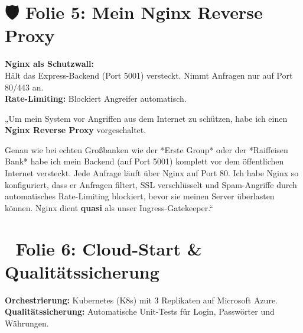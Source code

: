 \documentclass[11pt,a4paper]{article}
\begin{document}
\newpage

\section{🛡️ Folie 5: Mein Nginx Reverse Proxy}

\begin{tcolorbox}[colback=bglight, colframe=slidepurple, title=\textbf{\color{white}Visualisierung auf Folie 5}, arc=4pt]
\textbf{Nginx als Schutzwall:} \\
Hält das Express-Backend (Port 5001) versteckt. Nimmt Anfragen nur auf Port 80/443 an. \\
\textbf{Rate-Limiting:} Blockiert Angreifer automatisch.
\end{tcolorbox}

\begin{tcolorbox}[colback=white, colframe=primarynavy, title=\textbf{Mein Sprechtext (Ich-Form)}]
„Um mein System vor Angriffen aus dem Internet zu schützen, habe ich einen \textbf{Nginx Reverse Proxy} vorgeschaltet. 

Genau wie bei echten Großbanken wie der *Erste Group* oder der *Raiffeisen Bank* habe ich mein Backend (auf Port 5001) komplett vor dem öffentlichen Internet versteckt. Jede Anfrage läuft über Nginx auf Port 80. Ich habe Nginx so konfiguriert, dass er Anfragen filtert, SSL verschlüsselt und Spam-Angriffe durch automatisches Rate-Limiting blockiert, bevor sie meinen Server überlasten können. Nginx dient \textbf{quasi} als unser Ingress-Gatekeeper.“
\end{tcolorbox}

\vspace{1.2cm}

\section{🚀 Folie 6: Cloud-Start \& Qualitätssicherung}

\begin{tcolorbox}[colback=bglight, colframe=slidecyan, title=\textbf{\color{white}Visualisierung auf Folie 6}, arc=4pt]
\textbf{Orchestrierung:} Kubernetes (K8s) mit 3 Replikaten auf Microsoft Azure. \\
\textbf{Qualitätssicherung:} Automatische Unit-Tests für Login, Passwörter und Währungen.
\end{tcolorbox}
\end{document}

